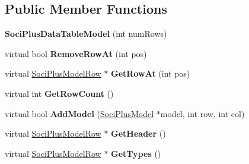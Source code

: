 \subsection*{Public Member Functions}
\begin{DoxyCompactItemize}
\item 
\hypertarget{class_soci_plus_1_1_soci_plus_data_table_model_ae820e6887a04205635aa0fd1b6d68c93}{{\bfseries Soci\+Plus\+Data\+Table\+Model} (int num\+Rows)}\label{class_soci_plus_1_1_soci_plus_data_table_model_ae820e6887a04205635aa0fd1b6d68c93}

\item 
\hypertarget{class_soci_plus_1_1_soci_plus_data_table_model_ad15c45cc7b2b4b224bad7a9bfe36e794}{virtual bool {\bfseries Remove\+Row\+At} (int pos)}\label{class_soci_plus_1_1_soci_plus_data_table_model_ad15c45cc7b2b4b224bad7a9bfe36e794}

\item 
\hypertarget{class_soci_plus_1_1_soci_plus_data_table_model_ab23c2056905cf57489dc5a3cd90d1586}{virtual \hyperlink{class_soci_plus_1_1_soci_plus_model_row}{Soci\+Plus\+Model\+Row} $\ast$ {\bfseries Get\+Row\+At} (int pos)}\label{class_soci_plus_1_1_soci_plus_data_table_model_ab23c2056905cf57489dc5a3cd90d1586}

\item 
\hypertarget{class_soci_plus_1_1_soci_plus_data_table_model_a45314f35c7e804b3bb4c863f00c24b3b}{virtual int {\bfseries Get\+Row\+Count} ()}\label{class_soci_plus_1_1_soci_plus_data_table_model_a45314f35c7e804b3bb4c863f00c24b3b}

\item 
\hypertarget{class_soci_plus_1_1_soci_plus_data_table_model_a77fa62aca7bf84f664a8ce72cd8a890b}{virtual bool {\bfseries Add\+Model} (\hyperlink{class_soci_plus_1_1_soci_plus_model}{Soci\+Plus\+Model} $\ast$model, int row, int col)}\label{class_soci_plus_1_1_soci_plus_data_table_model_a77fa62aca7bf84f664a8ce72cd8a890b}

\item 
\hypertarget{class_soci_plus_1_1_soci_plus_data_table_model_a06ab304eda4dfd6dd7c8aca2fb9a756a}{virtual \hyperlink{class_soci_plus_1_1_soci_plus_model_row}{Soci\+Plus\+Model\+Row} $\ast$ {\bfseries Get\+Header} ()}\label{class_soci_plus_1_1_soci_plus_data_table_model_a06ab304eda4dfd6dd7c8aca2fb9a756a}

\item 
\hypertarget{class_soci_plus_1_1_soci_plus_data_table_model_ac6b814da90881b5b07734c4b3731a951}{virtual \hyperlink{class_soci_plus_1_1_soci_plus_model_row}{Soci\+Plus\+Model\+Row} $\ast$ {\bfseries Get\+Types} ()}\label{class_soci_plus_1_1_soci_plus_data_table_model_ac6b814da90881b5b07734c4b3731a951}

\end{DoxyCompactItemize}

